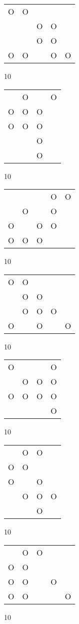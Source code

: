 \begin{tabular}{|m{0.2cm}m{0.2cm}m{0.2cm}m{0.2cm}m{0.2cm}|}\hline
O&O& & & \\
 & &O&O& \\
 & &O&O& \\
O&O& &O&O\\
\hline\end{tabular}10
\begin{tabular}{|m{0.2cm}m{0.2cm}m{0.2cm}m{0.2cm}|}\hline
 &O& &O\\
O&O&O& \\
O&O&O& \\
 & &O& \\
 & &O& \\
\hline\end{tabular}10
\begin{tabular}{|m{0.2cm}m{0.2cm}m{0.2cm}m{0.2cm}m{0.2cm}|}\hline
 & & &O&O\\
 &O& &O& \\
O& &O&O& \\
O&O&O& & \\
\hline\end{tabular}10
\begin{tabular}{|m{0.2cm}m{0.2cm}m{0.2cm}m{0.2cm}m{0.2cm}|}\hline
O&O& & & \\
 &O&O& & \\
 &O&O&O& \\
O& &O& &O\\
\hline\end{tabular}10
\begin{tabular}{|m{0.2cm}m{0.2cm}m{0.2cm}m{0.2cm}|}\hline
O& & &O\\
 &O&O&O\\
O&O&O&O\\
 & & &O\\
\hline\end{tabular}10
\begin{tabular}{|m{0.2cm}m{0.2cm}m{0.2cm}m{0.2cm}|}\hline
 &O&O& \\
O&O& & \\
O& &O& \\
 &O&O&O\\
 & &O& \\
\hline\end{tabular}10
\begin{tabular}{|m{0.2cm}m{0.2cm}m{0.2cm}m{0.2cm}m{0.2cm}|}\hline
 &O&O& & \\
O&O& & & \\
O&O& &O& \\
O&O& & &O\\
\hline\end{tabular}10
